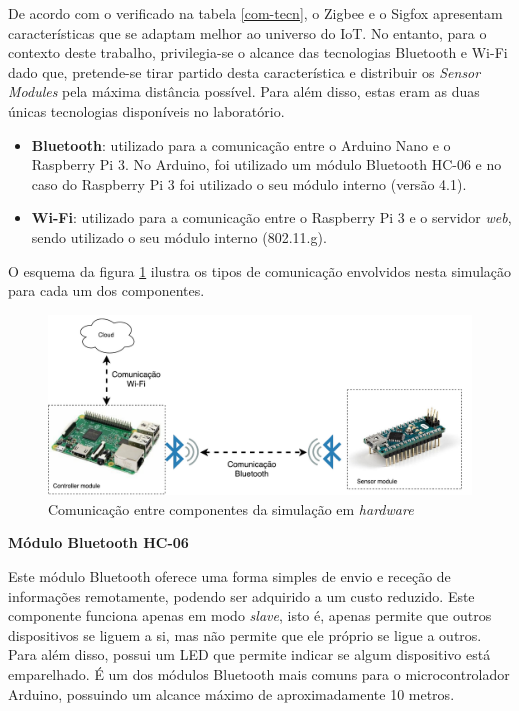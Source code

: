 De acordo com o verificado na tabela \ref{com-tecn}, o Zigbee e o Sigfox apresentam características que se adaptam melhor ao universo do \ac{IoT}. No entanto, para o contexto deste trabalho, privilegia-se o alcance das tecnologias Bluetooth e Wi-Fi dado que, pretende-se tirar partido desta característica e distribuir os  \textit{Sensor Modules} pela máxima distância possível. Para além disso, estas eram as duas únicas tecnologias disponíveis no laboratório.

\begin{itemize}
	\item \textbf{Bluetooth}: utilizado para a comunicação entre o Arduino Nano e o Raspberry Pi 3. No Arduino, foi utilizado um módulo Bluetooth HC-06 e no caso do Raspberry Pi 3 foi utilizado o seu módulo interno (versão 4.1). 
	\item \textbf{Wi-Fi}: utilizado para a comunicação entre o Raspberry Pi 3 e o servidor \textit{web}, sendo utilizado o seu módulo interno (802.11.g). 
\end{itemize}


O esquema da figura \ref{esquemcomm} ilustra os tipos de comunicação envolvidos nesta simulação para cada um dos componentes. 

\begin{figure}[!htb]
	\centering
	\includegraphics[width=\linewidth]{img/comm-blue/HW-geral.pdf}
	\caption{Comunicação entre componentes da simulação em \textit{hardware}}
	\label{esquemcomm}
\end{figure}




\textbf{Módulo Bluetooth HC-06}



Este módulo Bluetooth oferece uma forma simples de envio e receção de informações remotamente, podendo ser adquirido a um custo reduzido. Este componente funciona apenas em modo \textit{slave}, isto é, apenas permite que outros dispositivos se liguem a si, mas não permite que ele próprio se ligue a outros. Para além disso, possui um \ac{LED} que permite indicar se algum dispositivo está emparelhado. É um dos módulos Bluetooth mais comuns para o microcontrolador Arduino, possuindo um alcance máximo de aproximadamente 10 metros\cite{GuangzhouHCInformationTechnologyCo.2011}.


